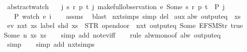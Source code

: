 \begin{isabellebody}
\endisatagproof
{\isafoldproof}%
%
\isadelimproof
\isanewline
%
\endisadelimproof
\isanewline
{}\isamarkupfalse%
\ abstract{\isacharunderscore}watch{\isacharcolon}\isanewline
\ \ \ {\isachardoublequoteopen}{\isasymAnd}j{\isachardot}\ {\isasymexists}s\ r\ p\ t{\isachardot}\ j{\isacharequal}\ make{\isacharunderscore}full{\isacharunderscore}observation\ e\ {\isacharparenleft}Some\ s{\isacharparenright}\ r\ p\ t\ {\isasymLongrightarrow}\ P\ j{\isachardoublequoteclose}\isanewline
\ \ \ {\isachardoublequoteopen}P\ {\isacharparenleft}watch\ e\ i{\isacharparenright}{\isachardoublequoteclose}\isanewline
%
\isadelimproof
\ \ %
\endisadelimproof
%
\isatagproof
{}\isamarkupfalse%
\ assms\ \isamarkupfalse%
\ blast%
\endisatagproof
{\isafoldproof}%
%
\isadelimproof
\isanewline
%
\endisadelimproof
\isanewline
{}\isamarkupfalse%
\ nxt{\isachardot}simps\ {\isacharbrackleft}simp\ del{\isacharbrackright}\isanewline
\isanewline
{}\isamarkupfalse%
\ aux{\isacharcolon}\isanewline
{\isachardoublequoteopen}alw\ {\isacharparenleft}output{\isacharunderscore}eq\ {\isacharbrackleft}{\isacharbrackright}{\isacharparenright}\ xs\ {\isasymLongrightarrow}\isanewline
\ {\isasymnot}ev\ {\isacharparenleft}nxt\ {\isacharparenleft}{\isasymlambda}xs{\isachardot}\ label\ {\isacharparenleft}shd\ xs{\isacharparenright}\ {\isacharequal}\ STR\ {\isacharprime}{\isacharprime}opendoor{\isacharprime}{\isacharprime}\ {\isasymand}\ nxt\ {\isacharparenleft}output{\isacharunderscore}eq\ {\isacharbrackleft}Some\ {\isacharparenleft}EFSM{\isachardot}Str\ {\isacharprime}{\isacharprime}true{\isacharprime}{\isacharprime}{\isacharparenright}{\isacharcomma}\ Some\ n{\isacharbrackright}{\isacharparenright}\ xs{\isacharparenright}{\isacharparenright}\ xs{\isachardoublequoteclose}\isanewline
%
\isadelimproof
\ \ %
\endisadelimproof
%
\isatagproof
{}\isamarkupfalse%
\ {\isacharparenleft}simp\ add{\isacharcolon}\ not{\isacharunderscore}ev{\isacharunderscore}iff{\isacharparenright}\isanewline
\ \ \isamarkupfalse%
\ {\isacharparenleft}rule\ alw{\isacharunderscore}mono{\isacharbrackleft}of\ {\isachardoublequoteopen}alw\ {\isacharparenleft}output{\isacharunderscore}eq\ {\isacharbrackleft}{\isacharbrackright}{\isacharparenright}{\isachardoublequoteclose}{\isacharbrackright}{\isacharparenright}\isanewline
\ \ \ \isamarkupfalse%
\ simp\isanewline
\ \ \isamarkupfalse%
\ {\isacharparenleft}simp\ add{\isacharcolon}\ nxt{\isachardot}simps{\isacharparenright}\isanewline

\end{isabellebody}
